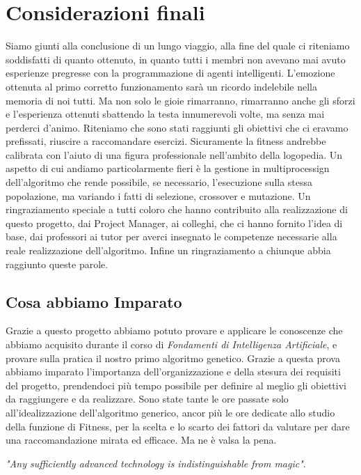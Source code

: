 \documentclass{article}
\begin{document}
\section{Considerazioni finali}
Siamo giunti alla conclusione di un lungo viaggio, alla fine del quale ci riteniamo soddisfatti di quanto ottenuto, in quanto tutti i membri non avevano mai avuto esperienze pregresse con la programmazione di agenti intelligenti. L'emozione ottenuta al primo corretto funzionamento sarà un ricordo indelebile nella memoria di noi tutti. Ma non solo le gioie rimarranno, rimarranno anche gli sforzi e l'esperienza ottenuti sbattendo la testa innumerevoli volte, ma senza mai perderci d'animo. Riteniamo che sono stati raggiunti gli obiettivi che ci eravamo prefissati, riuscire a raccomandare esercizi. Sicuramente la fitness andrebbe calibrata con l'aiuto di una figura professionale nell'ambito della logopedia. Un aspetto di cui andiamo particolarmente fieri è la gestione in multiprocessign dell'algoritmo che rende possibile, se necessario, l'esecuzione sulla stessa popolazione, ma variando i fatti di selezione, crossover e mutazione. Un ringraziamento speciale a tutti coloro che hanno contribuito alla realizzazione di questo progetto, dai Project Manager, ai colleghi, che ci hanno fornito l'idea di base, dai professori ai tutor per averci insegnato le competenze necessarie alla reale realizzazione dell'algoritmo. Infine un ringraziamento a chiunque abbia raggiunto queste parole.

\subsection{Cosa abbiamo Imparato}
Grazie a questo progetto abbiamo potuto provare e applicare le conoscenze che abbiamo acquisito durante il corso di \textit{Fondamenti di
Intelligenza Artificiale}, e provare sulla pratica il nostro primo algoritmo genetico. Grazie a questa prova abbiamo imparato l'importanza dell'organizzazione e della stesura dei requisiti del progetto, prendendoci più tempo possibile per definire al meglio gli obiettivi da raggiungere e da realizzare. Sono state tante le ore passate solo all'idealizzazione dell'algoritmo generico, ancor più le ore dedicate allo studio della funzione di Fitness, per la scelta e lo scarto dei fattori da valutare per dare una raccomandazione mirata ed efficace. Ma ne è valsa la pena.
\bigskip

\textit{"Any sufficiently advanced technology is indistinguishable from magic"}.
\pagebreak
\end{document}

